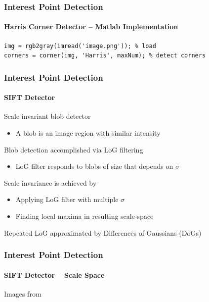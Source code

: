 \documentclass[xetex,professionalfont]{beamer}
\begin{document}

\begin{frame}[fragile]
\frametitle{Interest Point Detection}
\framesubtitle{Harris Corner Detector -- Matlab Implementation}

\begin{verbatim}
img = rgb2gray(imread('image.png')); % load
corners = corner(img, 'Harris', maxNum); % detect corners
\end{verbatim}

\end{frame}


\begin{frame}
\frametitle{Interest Point Detection}
\framesubtitle{SIFT Detector}

Scale invariant blob detector
\begin{itemize}
	\item A blob is an image region with similar intensity %
\end{itemize}

\bigskip
Blob detection accomplished via LoG filtering
\begin{itemize}
	\item LoG filter responds to blobs of size that depends on $\sigma$
\end{itemize}

\bigskip
Scale invariance is achieved by
\begin{itemize}
	\item Applying LoG filter with multiple $\sigma$
	\item Finding local maxima in resulting scale-space
\end{itemize}

\bigskip
Repeated LoG approximated by Differences of Gaussians (DoGs)

\end{frame}


\begin{frame}
\frametitle{Interest Point Detection}
\framesubtitle{SIFT Detector -- Scale Space}

\begin{center}
	{\centering Images from \cite{prince12}}
\end{center}

\end{frame}
\end{document}
